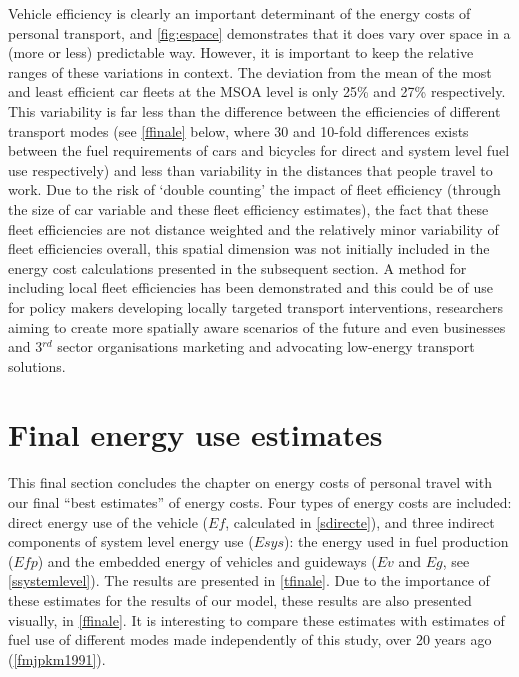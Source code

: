 \documentclass[a4paper, 11pt, twoside]{Thesis}
\begin{document}
Vehicle efficiency is clearly an important determinant of the energy costs of
personal transport, and \cref{fig:espace} demonstrates that it does vary over space in a
(more or less) predictable way. However, it is important to keep the relative
ranges of these variations in context. The deviation from the mean of the most
and least efficient car fleets at the MSOA level is only 25\% and 27\% respectively. This
variability is far less than the difference between the efficiencies of
different transport modes (see \cref{ffinale} below,
where 30 and 10-fold differences exists between the
fuel requirements of cars and bicycles for direct and system level fuel use
respectively) and less than variability in the distances that people travel
to work. Due to the risk of `double counting' the impact of fleet efficiency
(through the size of car variable and these fleet efficiency estimates),
the fact that these fleet efficiencies are not distance weighted and
the relatively minor variability of fleet efficiencies overall,
this spatial dimension was not initially included in the energy cost
calculations presented in the subsequent section.
A method for including local fleet efficiencies has been demonstrated
and this could be of use for policy makers developing locally targeted
transport interventions, researchers aiming to create more
spatially aware scenarios of the future and even businesses and 
3$^{rd}$ sector organisations marketing and advocating low-energy
transport solutions. 


\section{Final energy use estimates} \label{sfinal} 
This final section concludes the chapter on energy costs of personal travel
with our final ``best estimates'' of energy costs. Four types of energy
costs are included: direct energy use of the vehicle ($Ef$, calculated
in \cref{sdirecte}), and three indirect components of system level energy
use ($Esys$): the energy used in fuel production ($Efp$) and the embedded
energy of vehicles and guideways ($Ev$ and $Eg$, see \cref{ssystemlevel}).
The results are presented in \cref{tfinale}. Due to the importance of these
estimates for the results of our model, these results are also presented
visually, in \cref{ffinale}. It is interesting to compare these estimates
with estimates of fuel use of different modes made independently of this
study, over 20 years ago (\cref{fmjpkm1991}).
\end{document}
